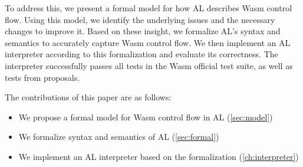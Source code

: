 To address this, we present a formal model for how AL describes Wasm control flow.
Using this model, we identify the underlying issues and the necessary changes
to improve it.
Based on these insight, we formalize AL's syntax and semantics to accurately
capture Wasm control flow.
We then implement an AL interpreter according to this formalization and
evaluate its correctness.
The interpreter successfully passes all tests in the Wasm official test suite,
as well as tests from proposals.


The contributions of this paper are as follows:
\begin{itemize}
  \item We propose a formal model for Wasm control flow in AL (\cref{sec:model})
  \item We formalize syntax and semantics of AL (\cref{sec:formal})
  \item We implement an AL interpreter based on the formalization (\cref{ch:interpreter})
\end{itemize}
